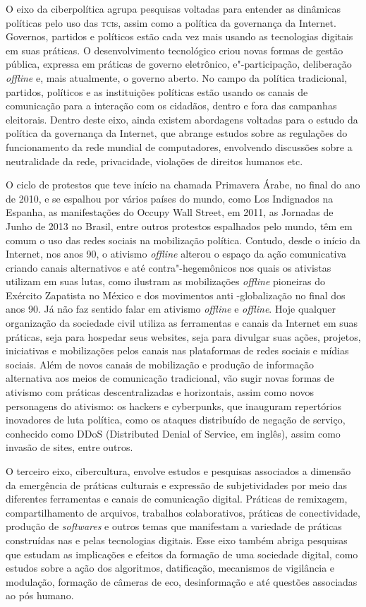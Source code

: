 O eixo da ciberpolítica agrupa pesquisas voltadas para entender as
dinâmicas políticas pelo uso das \textsc{tci}s, assim como a política da
governança da Internet. Governos, partidos e políticos estão cada vez
mais usando as tecnologias digitais em suas práticas. O desenvolvimento
tecnológico criou novas formas de gestão pública, expressa em práticas
de governo eletrônico, e"-participação, deliberação \emph{offline} e, mais
atualmente, o governo aberto. No campo da política tradicional,
partidos, políticos e as instituições políticas estão usando os canais
de comunicação para a interação com os cidadãos, dentro e fora das
campanhas eleitorais. Dentro deste eixo, ainda existem abordagens
voltadas para o estudo da política da governança da Internet, que
abrange estudos sobre as regulações do funcionamento da rede mundial de
computadores, envolvendo discussões sobre a neutralidade da rede,
privacidade, violações de direitos humanos etc.

O ciclo de protestos que teve início na chamada Primavera Árabe, no
final do ano de 2010, e se espalhou por vários países do mundo, como Los
Indignados na Espanha, as manifestações do Occupy Wall Street, em 2011,
as Jornadas de Junho de 2013 no Brasil, entre outros protestos
espalhados pelo mundo, têm em comum o uso das redes sociais na
mobilização política. Contudo, desde o início da Internet, nos anos 90,
o ativismo \emph{offline} alterou o espaço da ação comunicativa criando canais
alternativos e até contra"-hegemônicos nos quais os ativistas utilizam em
suas lutas, como ilustram as mobilizações \emph{offline} pioneiras do Exército
Zapatista no México e dos movimentos anti -globalização no final dos
anos 90. Já não faz sentido falar em ativismo \emph{offline} e \emph{offline}. Hoje
qualquer organização da sociedade civil utiliza as ferramentas e canais
da Internet em suas práticas, seja para hospedar seus websites, seja
para divulgar suas ações, projetos, iniciativas e mobilizações pelos
canais nas plataformas de redes sociais e mídias sociais. Além de novos
canais de mobilização e produção de informação alternativa aos meios de
comunicação tradicional, vão sugir novas formas de ativismo com práticas
descentralizadas e horizontais, assim como novos personagens do
ativismo: os hackers e cyberpunks, que inauguram repertórios inovadores
de luta política, como os ataques distribuído de negação de serviço,
conhecido como DDoS (Distributed Denial of Service, em inglês), assim
como invasão de sites, entre outros.

O terceiro eixo, cibercultura, envolve estudos e pesquisas associados a
dimensão da emergência de práticas culturais e expressão de
subjetividades por meio das diferentes ferramentas e canais de
comunicação digital. Práticas de remixagem, compartilhamento de
arquivos, trabalhos colaborativos, práticas de conectividade, produção
de \emph{\emph{\emph{software}}s} e outros temas que manifestam a variedade de práticas
construídas nas e pelas tecnologias digitais. Esse eixo também abriga
pesquisas que estudam as implicações e efeitos da formação de uma
sociedade digital, como estudos sobre a ação dos algoritmos,
datificação, mecanismos de vigilância e modulação, formação de câmeras
de eco, desinformação e até questões associadas ao pós humano.

